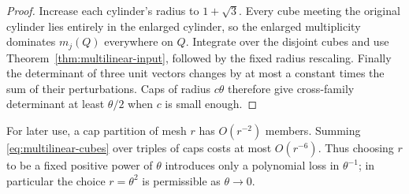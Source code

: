 \begin{proof}
Increase each cylinder's radius to $1+\sqrt3$. Every cube meeting
the original cylinder lies entirely in the enlarged cylinder, so
the enlarged multiplicity dominates $m_j(Q)$ everywhere on $Q$.
Integrate over the disjoint cubes and use
Theorem~\ref{thm:multilinear-input}, followed by the fixed radius
rescaling. Finally the determinant of three unit vectors changes
by at most a constant times the sum of their perturbations.
Caps of radius $c\theta$ therefore give cross-family determinant
at least $\theta/2$ when $c$ is small enough.
\end{proof}

For later use, a cap partition of mesh $r$ has $O(r^{-2})$ members.
Summing \eqref{eq:multilinear-cubes} over triples of caps costs at
most $O(r^{-6})$. Thus choosing $r$ to be a fixed positive power
of $\theta$ introduces only a polynomial loss in $\theta^{-1}$;
in particular the choice $r=\theta^2$ is permissible as
$\theta\to0$.
